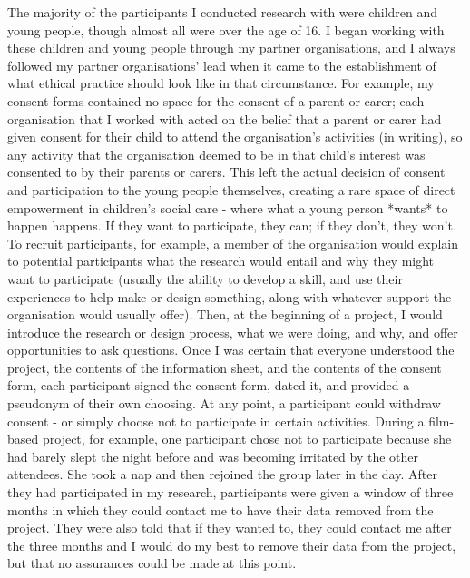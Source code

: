 The majority of the participants I conducted research with were children and young people, though almost all were over the age of 16. I began working with these children and young people through my partner organisations, and I always followed my partner organisations’ lead when it came to the establishment of what ethical practice should look like in that circumstance. For example, my consent forms contained no space for the consent of a parent or carer; each organisation that I worked with acted on the belief that a parent or carer had given consent for their child to attend the organisation’s activities (in writing), so any activity that the organisation deemed to be in that child’s interest was consented to by their parents or carers. This left the actual decision of consent and participation to the young people themselves, creating a rare space of direct empowerment in children’s social care - where what a young person *wants* to happen happens. If they want to participate, they can; if they don’t, they won’t. To recruit participants, for example, a member of the organisation would explain to potential participants what the research would entail and why they might want to participate (usually the ability to develop a skill, and use their experiences to help make or design something, along with whatever support the organisation would usually offer). Then, at the beginning of a project, I would introduce the research or design process, what we were doing, and why, and offer opportunities to ask questions. Once I was certain that everyone understood the project, the contents of the information sheet, and the contents of the consent form, each participant signed the consent form, dated it, and provided a pseudonym of their own choosing. At any point, a participant could withdraw consent - or simply choose not to participate in certain activities. During a film-based project, for example, one participant chose not to participate because she had barely slept the night before and was becoming irritated by the other attendees. She took a nap and then rejoined the group later in the day. After they had participated in my research, participants were given a window of three months in which they could contact me to have their data removed from the project. They were also told that if they wanted to, they could contact me after the three months and I would do my best to remove their data from the project, but that no assurances could be made at this point. 

